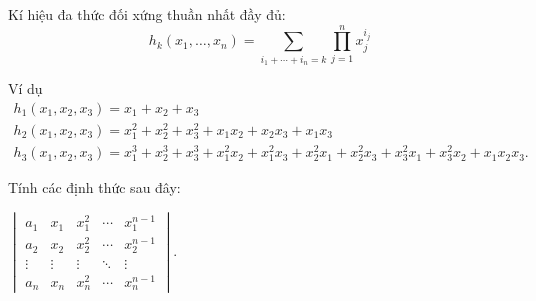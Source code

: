 \documentclass[class=linear-algebra,crop=false]{standalone}
\begin{document}
\par Kí hiệu đa thức đối xứng thuần nhất đầy đủ:
\[
	h_{k}(x_{1}, \ldots, x_{n}) = \sum_{i_{1}+\cdots+i_{n}=k}\prod^{n}_{j=1}x^{i_{j}}_{j}
\]

\par Ví dụ
\begin{gather*}
	h_{1}(x_{1}, x_{2}, x_{3}) = x_{1} + x_{2} + x_{3} \\
	h_{2}(x_{1}, x_{2}, x_{3}) = x_{1}^{2} + x_{2}^{2} + x_{3}^{2} + x_{1}x_{2} + x_{2}x_{3} + x_{1}x_{3} \\
	h_{3}(x_{1}, x_{2}, x_{3}) = x_{1}^{3} + x_{2}^{3} + x_{3}^{3} + x_{1}^{2}x_{2} + x_{1}^{2}x_{3} + x_{2}^{2}x_{1} + x_{2}^{2}x_{3} + x_{3}^{2}x_{1} + x_{3}^{2}x_{2} + x_{1}x_{2}x_{3}.
\end{gather*}

\par Tính các định thức sau đây:

\begin{exercise}
	$\begin{vmatrix}
			a_{1}  & x_{1}  & x_{1}^{2} & \cdots & x_{1}^{n-1} \\
			a_{2}  & x_{2}  & x_{2}^{2} & \cdots & x_{2}^{n-1} \\
			\vdots & \vdots & \vdots    & \ddots & \vdots      \\
			a_{n}  & x_{n}  & x_{n}^{2} & \cdots & x_{n}^{n-1}
		\end{vmatrix}$.
\end{exercise}
\end{document}
